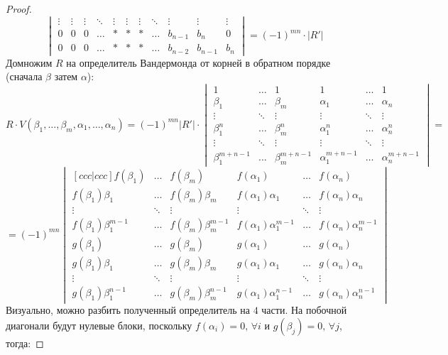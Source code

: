 \documentclass[12pt]{article}
\theoremstyle{definition}
\begin{document}
\begin{proof}
$$\begin{vmatrix}
			\vdots & \vdots  & \vdots & \ddots& \vdots & \vdots &\vdots & \ddots & \vdots & \vdots & \vdots \\
			0 & 0 & 0 & \dotsc & * & * & * & \dotsc & b_{n-1} & b_n & 0\\
			0 & 0 & 0 & \dotsc & * & * & * & \dotsc & b_{n-2} & b_{n-1} & b_n
		\end{vmatrix} = (-1)^{mn}{\cdot}|R'|
	$$
	Домножим $R$ на определитель Вандермонда от корней в обратном порядке (сначала $\beta$ затем $\alpha$):
	$$
		R{\cdot}V(\beta_1,\dotsc,\beta_m,\alpha_1,\dotsc,\alpha_n) = (-1)^{mn}|R'|{\cdot}
		\begin{vmatrix}
			1 & \dotsc & 1 & 1 & \dotsc & 1\\
			\beta_1 & \dotsc & \beta_m & \alpha_1 & \dotsc & \alpha_n \\
			\vdots & \ddots & \vdots & \vdots & \ddots & \vdots \\
			\beta_1^n & \dotsc & \beta_m^n & \alpha_1^n & \dotsc & \alpha_n^n \\
			\vdots & \ddots & \vdots & \vdots & \ddots & \vdots \\
			\beta_1^{m + n - 1} & \dotsc & \beta_m^{m + n - 1} & \alpha_1^{m + n - 1} & \dotsc & \alpha_n^{m + n - 1}
		\end{vmatrix} =
	$$ 
	$$
		= (-1)^{mn} 
		\begin{vmatrix}[ccc|ccc]
			f(\beta_1) & \dotsc & f(\beta_m) & f(\alpha_1) & \dotsc & f(\alpha_n)\\
			f(\beta_1)\beta_1 & \dotsc & f(\beta_m)\beta_m & f(\alpha_1)\alpha_1 & \dotsc & f(\alpha_n)\alpha_n\\
			\vdots & \ddots & \vdots & \vdots  & \ddots  & \vdots \\
			f(\beta_1)\beta_1^{m - 1} & \dotsc & f(\beta_m)\beta_m^{m - 1} & f(\alpha_1)\alpha_1^{m - 1} & \dotsc & f(\alpha_n)\alpha_n^{m - 1}\\ \hline
			g(\beta_1) & \dotsc & g(\beta_m) & g(\alpha_1) & \dotsc & g(\alpha_n)\\
			g(\beta_1)\beta_1 & \dotsc & g(\beta_m)\beta_m & g(\alpha_1)\alpha_1 & \dotsc & g(\alpha_n)\alpha_n\\
			\vdots & \ddots & \vdots & \vdots  & \ddots  & \vdots \\
			g(\beta_1)\beta_1^{n - 1} & \dotsc & g(\beta_m)\beta_m^{n - 1} & g(\alpha_1)\alpha_1^{n - 1} & \dotsc & g(\alpha_n)\alpha_n^{n - 1}
		\end{vmatrix}
	$$
	Визуально, можно разбить полученный определитель на $4$ части. На побочной диагонали будут нулевые блоки, поскольку $f(\alpha_i) = 0, \, \forall i$ и $g(\beta_j) = 0, \, \forall j$, тогда:

\end{proof}
\end{document}
